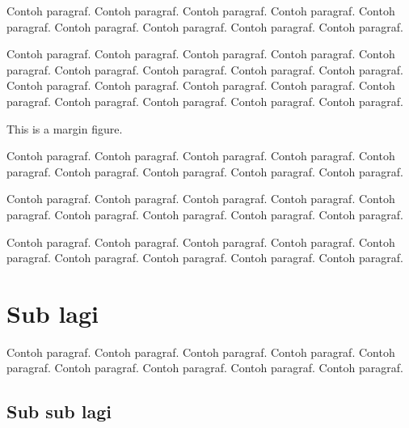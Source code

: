 \documentclass[twoside,bahasa]{tufte-book}
\begin{document}
Contoh paragraf. Contoh paragraf. Contoh paragraf. Contoh paragraf.
Contoh paragraf. Contoh paragraf. Contoh paragraf. Contoh paragraf.
Contoh paragraf.

Contoh paragraf. Contoh paragraf. Contoh paragraf. Contoh paragraf.
Contoh paragraf. Contoh paragraf. Contoh paragraf. Contoh paragraf.
Contoh paragraf.
Contoh paragraf. Contoh paragraf. Contoh paragraf. Contoh paragraf.
Contoh paragraf. Contoh paragraf. Contoh paragraf. Contoh paragraf.
Contoh paragraf.

\begin{marginfigure}
\caption{This is a margin figure.}
\label{fig:marginfig}
\end{marginfigure}

Contoh paragraf. Contoh paragraf. Contoh paragraf. Contoh paragraf.
Contoh paragraf. Contoh paragraf. Contoh paragraf. Contoh paragraf.
Contoh paragraf.

Contoh paragraf. Contoh paragraf. Contoh paragraf. Contoh paragraf.
Contoh paragraf. Contoh paragraf. Contoh paragraf. Contoh paragraf.
Contoh paragraf.

Contoh paragraf. Contoh paragraf. Contoh paragraf. Contoh paragraf.
Contoh paragraf. Contoh paragraf. Contoh paragraf. Contoh paragraf.
Contoh paragraf.

\section{Sub lagi}

Contoh paragraf. Contoh paragraf. Contoh paragraf. Contoh paragraf.
Contoh paragraf. Contoh paragraf. Contoh paragraf. Contoh paragraf.
Contoh paragraf.

\subsection{Sub sub lagi}
\end{document}
